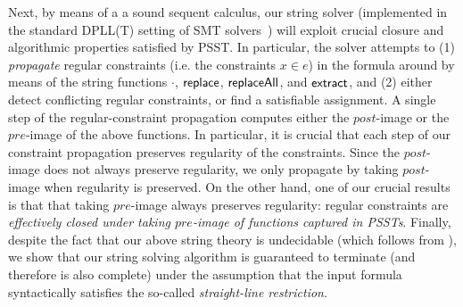 Next, by means of a a sound sequent calculus, our string solver (implemented in 
the standard DPLL(T) setting of SMT solvers~\cite{NieuwenhuisetalJACM2006}) 
will exploit crucial closure and algorithmic properties satisfied by PSST.
In particular, the solver attempts to
(1) \emph{propagate} regular constraints (i.e. the constraints $x \in e$) in the formula around by means of
the string functions $\cdot$, $\mathsf{replace}$, $\mathsf{replaceAll}$, and $\mathsf{extract}$, and 
(2) either detect conflicting regular constraints, or find a satisfiable assignment.
A single step of the regular-constraint propagation computes either the 
$post$-image or the $pre$-image of the above functions. In particular, 
it is crucial that each step of our constraint propagation preserves
regularity of the constraints.
Since the $post$-image does not always preserve regularity,
we only propagate by taking $post$-image when regularity is preserved.
On the other hand, one of our crucial results is that that taking $pre$-image 
always preserves regularity:
regular constraints are \emph{effectively closed under
taking $pre$-image of functions captured in PSSTs}.
Finally, despite the fact that our above string theory is undecidable
(which follows from \cite{LB16}), we show that our string solving algorithm is
guaranteed to terminate (and therefore is also complete) under the assumption
that the input formula syntactically satisfies the so-called 
\emph{straight-line restriction}.

